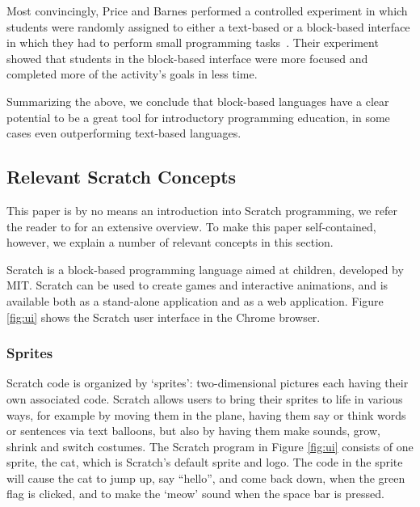 \documentclass{sig-alternate}
\begin{document}
Most convincingly, Price and Barnes performed a controlled experiment in which students were randomly assigned to either a text-based or a block-based interface in  which they had to perform small programming tasks~\cite{price_comparing_2015}. Their experiment showed that students in the block-based interface were more focused and completed more of the activity's goals in less time.

Summarizing the above, we conclude that block-based languages have a clear potential to be a great tool for introductory programming education, in some cases even outperforming text-based languages.

\subsection{Relevant Scratch Concepts}
\label{sec:scratch}
This paper is by no means an introduction into Scratch programming, we refer the reader to \cite{brennan_creative_2014} for an extensive overview. To make this paper self-contained, however, we explain a number of relevant concepts in this section. 

Scratch is a block-based programming language aimed at children, developed by MIT. Scratch can be used to create games and interactive animations, and is available both as a stand-alone application and as a web application. Figure \ref{fig:ui} shows the Scratch user interface in the Chrome browser.

\subsubsection{Sprites}
Scratch code is organized by `sprites': two-dimensional pictures each having their own associated code. Scratch allows users to bring their sprites to life in various ways, for example by moving them in the plane, having them say or think words or sentences via text balloons, but also by having them make sounds, grow, shrink and switch costumes. The Scratch program in Figure \ref{fig:ui} consists of one sprite, the cat, which is Scratch's default sprite and logo. The code in the sprite will cause the cat to jump up, say ``hello'', and come back down, when the green flag is clicked, and to make the `meow' sound when the space bar is pressed.
\end{document}

